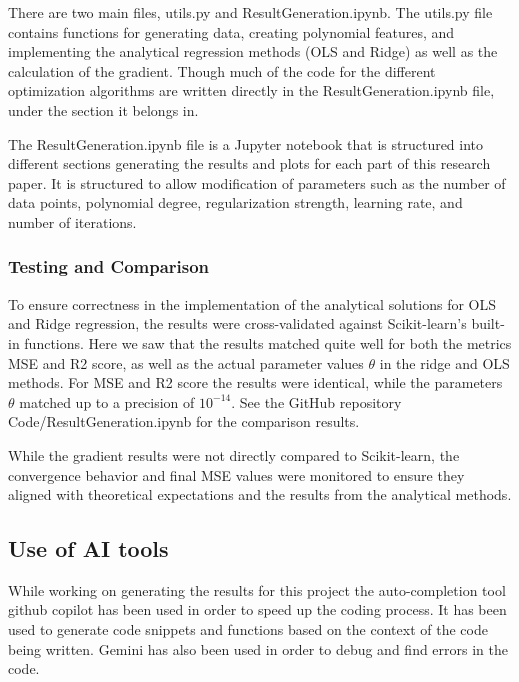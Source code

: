 \documentclass[twocolumn,aps]{revtex4}
\begin{document}
There are two main files, utils.py and ResultGeneration.ipynb.
The utils.py file contains functions for generating data, creating polynomial features, and implementing the analytical regression methods (OLS and Ridge) as well as the calculation of the gradient.
Though much of the code for the different optimization algorithms are written directly in the ResultGeneration.ipynb file, under the section it belongs in.

The ResultGeneration.ipynb file is a Jupyter notebook that is structured into different sections generating the results and plots for each part of this research paper.
It is structured to allow modification of parameters such as the number of data points, polynomial degree, regularization strength, learning rate, and number of iterations.



\subsubsection{Testing and Comparison}
To ensure correctness in the implementation of the analytical solutions for OLS and Ridge regression, the results were cross-validated against Scikit-learn's built-in functions.
Here we saw that the results matched quite well for both the metrics MSE and R2 score, as well as the actual parameter values $\theta$ in the ridge and OLS methods.
For MSE and R2 score the results were identical, while the parameters $\theta$ matched up to a precision of $10^{-14}$.
See the GitHub repository \cite{rep} Code/ResultGeneration.ipynb for the comparison results.

While the gradient results were not directly compared to Scikit-learn, the convergence behavior and final MSE values were monitored to ensure they aligned with theoretical expectations and the results from the analytical methods.

\subsection{Use of AI tools}
While working on generating the results for this project the auto-completion tool github copilot has been used in order to speed up the coding process.
It has been used to generate code snippets and functions based on the context of the code being written.
Gemini has also been used in order to debug and find errors in the code.
\end{document}
